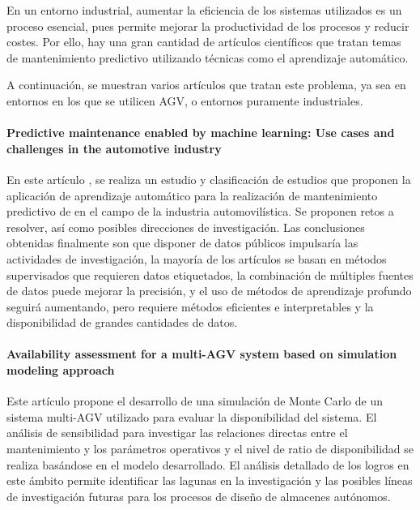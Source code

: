

En un entorno industrial, aumentar la eficiencia de los sistemas utilizados es un proceso esencial, pues permite 
mejorar la productividad de los procesos y reducir costes. Por ello, hay una gran cantidad de artículos científicos 
que tratan temas de mantenimiento predictivo utilizando técnicas como el aprendizaje automático.

A continuación, se muestran varios artículos que tratan este problema, ya sea en entornos en los que se utilicen
AGV, o entornos puramente industriales.
\paragraph{Predictive maintenance enabled by machine learning: Use cases and challenges in the automotive industry}
En este artículo \cite{THEISSLER2021107864}, se realiza un estudio y clasificación de estudios que proponen la aplicación de aprendizaje 
automático para la realización de mantenimiento predictivo de en el campo de la industria automovilística.
Se proponen retos a resolver, así como posibles direcciones de investigación. Las conclusiones obtenidas finalmente 
son que disponer de datos públicos impulsaría las actividades de investigación, la mayoría de los artículos se basan 
en métodos supervisados que requieren datos etiquetados, la combinación de múltiples fuentes de datos puede 
mejorar la precisión, y el uso de métodos de aprendizaje profundo seguirá aumentando, pero requiere métodos 
eficientes e interpretables y la disponibilidad de grandes cantidades de datos.

\paragraph{Availability assessment for a multi-AGV system based on simulation modeling approach}
Este artículo \cite{9590979} propone el desarrollo de una simulación de Monte Carlo de un sistema multi-AGV 
utilizado para evaluar la disponibilidad del sistema. El análisis de sensibilidad para investigar las relaciones 
directas entre el mantenimiento y los parámetros operativos y el nivel de ratio de disponibilidad se 
realiza basándose en el modelo desarrollado. El análisis detallado de los logros en este ámbito permite 
identificar las lagunas en la investigación y las posibles líneas de investigación futuras para los 
procesos de diseño de almacenes autónomos.

